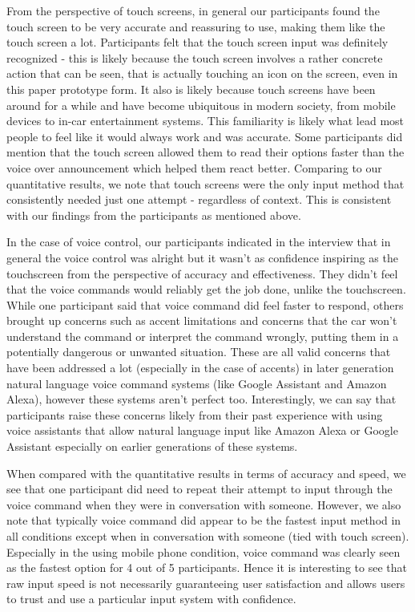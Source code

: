 \documentclass{sigchi}
\begin{document}
From the perspective of touch screens, in general our participants found the touch screen to be very accurate and reassuring to use, making them like the touch screen a lot. Participants felt that the touch screen input was definitely recognized - this is likely because the touch screen involves a rather concrete action that can be seen, that is actually touching an icon on the screen, even in this paper prototype form. It also is likely because touch screens have been around for a while and have become ubiquitous in modern society, from mobile devices to in-car entertainment systems. This familiarity is likely what lead most people to feel like it would always work and was accurate. Some participants did mention that the touch screen allowed them to read their options faster than the voice over announcement which helped them react better. Comparing to our quantitative results, we note that touch screens were the only input method that consistently needed just one attempt - regardless of context. This is consistent with our findings from the participants as mentioned above.

In the case of voice control, our participants indicated in the interview that in general the voice control was alright but it wasn't as confidence inspiring as the touchscreen from the perspective of accuracy and effectiveness. They didn't feel that the voice commands would reliably get the job done, unlike the touchscreen. While one participant said that voice command did feel faster to respond, others brought up concerns such as accent limitations and concerns that the car won't understand the command or interpret the command wrongly, putting them in a potentially dangerous or unwanted situation. These are all valid concerns that have been addressed a lot (especially in the case of accents) in later generation natural language voice command systems (like Google Assistant and Amazon Alexa), however these systems aren't perfect too. Interestingly, we can say that participants raise these concerns likely from their past experience with using voice assistants that allow natural language input like Amazon Alexa or Google Assistant especially on earlier generations of these systems. 

When compared with the quantitative results in terms of accuracy and speed, we see that one participant did need to repeat their attempt to input through the voice command when they were in conversation with someone. However, we also note that typically voice command did appear to be the fastest input method in all conditions except when in conversation with someone (tied with touch screen). Especially in the using mobile phone condition, voice command was clearly seen as the fastest option for 4 out of 5 participants. Hence it is interesting to see that raw input speed is not necessarily guaranteeing user satisfaction and allows users to trust and use a particular input system with confidence.
\end{document}
